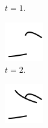 \begin{figure}
\begin{subfigure}{.1\textwidth}
        \caption{$t=1$.}
    \end{subfigure}
    \begin{subfigure}{.1\textwidth}
        \includegraphics[width=\textwidth]{graphics/work-artifacts/marked/full/3/test-1.png}
        \caption{$t=2$.}
    \end{subfigure}
    \begin{subfigure}{.1\textwidth}
        \includegraphics[width=\textwidth]{graphics/work-artifacts/marked/full/3/test-2.png}

\end{subfigure}
\end{figure}
